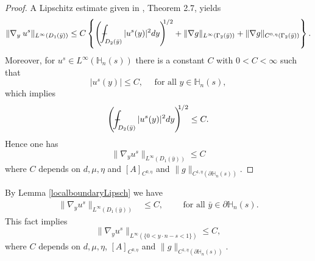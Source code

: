 \documentclass[11pt, reqno]{amsart}
\theoremstyle{definition}
\theoremstyle{remark}
\numberwithin{equation}{section}
\def\Xint#1{\mathchoice
	{\XXint\displaystyle\textstyle{#1}}%
	{\XXint\textstyle\scriptstyle{#1}}%
	{\XXint\scriptstyle\scriptscriptstyle{#1}}%
	{\XXint\scriptscriptstyle\scriptscriptstyle{#1}}%
	\!\int}
\def\XXint#1#2#3{{\setbox0=\hbox{$#1{#2#3}{\int}$ }
		\vcenter{\hbox{$#2#3$ }}\kern-.6\wd0}}
\def\dashint{\Xint-}        %
\begin{document}
\begin{appendices}
\begin{proof}
	
	\noindent
	
	\noindent A Lipschitz estimate given in   \cite{optimBoundEstimate}, Theorem 2.7, yields
	\begin{equation*}\label{estimLips}
		\| \nabla_y \: u^s \|_{L^{\infty}(D_1( \bar{y} ))} \leq  C\left\{ \left(  \dashint_{D_2 ( \bar{y} )} |u^s(y)|^2  dy  \right)^{\!\!\!1/2} + \| \nabla g \|_{ L^{\infty}(\Gamma_2 ( \bar{y} ) ) } +\| \nabla g \|_{ C^{0,\eta}(\Gamma_2 ( \bar{y} ) ) }    \right\}.
	\end{equation*}
	Moreover, for $u^s\in L^\infty({\mathbb{H}}_n(s))$  there is a constant $C$ with $0<C<\infty$ such  that
	\begin{equation*}
	|u^s(y)| \leq   C , \quad \mbox{ for all } y\in\mathbb{H}_n(s),
\end{equation*}
which implies
	\begin{equation*}
	\left(  \dashint_{D_2 ( \bar{y} )} |u^s(y)|^2  dy  \right)^{\!\!\!1/2} \leq C  .
\end{equation*}
Hence one has
	\begin{equation*}
		\| \nabla_y u^s \|_{L^{\infty}(D_1( \bar{y} ))} \leq  C
	\end{equation*}	where $C$ depends on $d,\mu, \eta$ and $[A]_{C^{0,\eta}}$ and $ \| g \|_{ C^{1,\eta}( \partial{\mathbb{H}}_n(s) ) }$.
\end{proof}
\noindent By Lemma \ref{localboundaryLipsch} we have
\begin{align*}
	\| \nabla_y u^s \|_{L^{\infty}(D_1( \bar{y} ))}&\leq  C, \qquad \mbox{ for all }\bar{y} \in \partial{\mathbb{H}}_n(s).
\end{align*}
 This fact implies 
\begin{equation}\label{bound_nab_u_boundry}
	\| \nabla_y u^s \|_{L^{\infty}(\{ 0<y\cdot n -s <1 \})} \leq  C,
\end{equation}
where $C$ depends on  $d,\mu, \eta$, $[A]_{C^{0,\eta}}$ and $ \| g \|_{ C^{1,\eta} (\partial{\mathbb{H}}_n(s)  ) }$.\\



\end{appendices}
\end{document}

